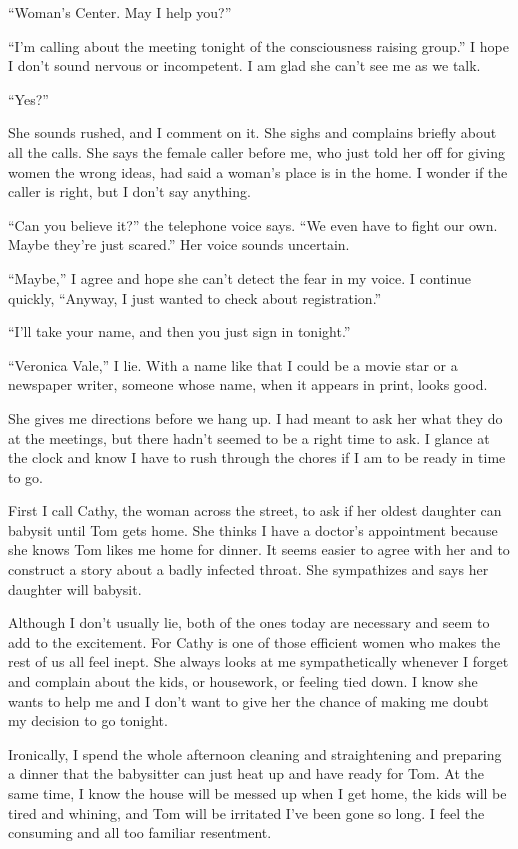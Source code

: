 \documentclass[twoside,10pt]{book}
\begin{document}
``Woman's Center. May I help you?''

``I'm calling about the meeting tonight of the consciousness raising
group.'' I hope I don't sound nervous or incompetent. I am glad she
can't see me as we talk.

``Yes?''

She sounds rushed, and I comment on it. She sighs and complains briefly
about all the calls. She says the female caller before me, who just told
her off for giving women the wrong ideas, had said a woman's place is in
the home. I wonder if the caller is right, but I don't say anything.

``Can you believe it?'' the telephone voice says. ``We even have to
fight our own. Maybe they're just scared.'' Her voice sounds uncertain.

``Maybe,'' I agree and hope she can't detect the fear in my voice. I
continue quickly, ``Anyway, I just wanted to check about registration.''

``I'll take your name, and then you just sign in tonight.''

``Veronica Vale,'' I lie. With a name like that I could be a movie star
or a newspaper writer, someone whose name, when it appears in print,
looks good.

She gives me directions before we hang up. I had meant to ask her what
they do at the meet­ings, but there hadn't seemed to be a right time to
ask. I glance at the clock and know I have to rush through the chores if
I am to be ready in time to go.

First I call Cathy, the woman across the street, to ask if her oldest
daughter can babysit until Tom gets home. She thinks I have a doctor's
appointment because she knows Tom likes me home for dinner. It seems
easier to agree with her and to construct a story about a badly infected
throat. She sympathizes and says her daughter will babysit.

Although I don't usually lie, both of the ones today are necessary and
seem to add to the excitement. For Cathy is one of those efficient women
who makes the rest of us all feel inept. She always looks at me
sympathetically whenever I forget and complain about the kids, or
housework, or feeling tied down. I know she wants to help me and I don't
want to give her the chance of making me doubt my decision to go
tonight.

Ironically, I spend the whole afternoon cleaning and straightening and
preparing a dinner that the babysitter can just heat up and have ready
for Tom. At the same time, I know the house will be messed up when I get
home, the kids will be tired and whining, and Tom will be irritated I've
been gone so long. I feel the consuming and all too familiar resentment.
\end{document}
